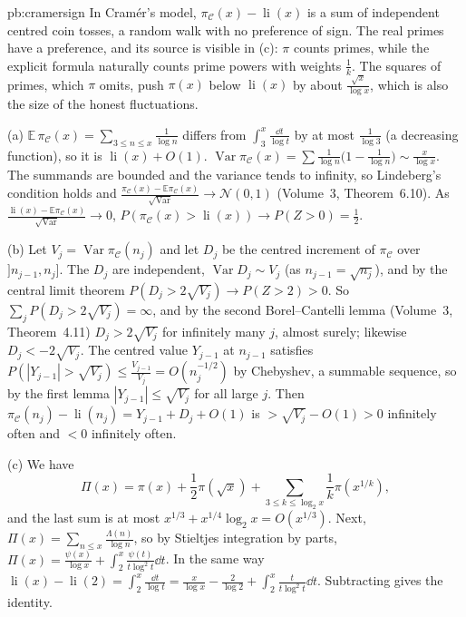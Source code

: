 \begin{solution}{pb:cramersign}
\idea In Cramér's model, $\pi_{\mathcal C}(x)-\operatorname{li}(x)$ is a sum of independent centred coin tosses, a random walk with no preference of sign. The real primes have a preference,
and its source is visible in (c): $\pi$ counts primes, while the explicit formula naturally counts prime powers with weights $\frac1k$. The squares of primes, which $\pi$ omits,
push $\pi(x)$ below $\operatorname{li}(x)$ by about $\frac{\sqrt x}{\log x}$, which is also the size of the honest fluctuations.

\writeup (a) $\mathbb E\,\pi_{\mathcal C}(x)=\sum_{3\le n\le x}\frac1{\log n}$ differs from $\int_3^x\frac{\dd t}{\log t}$ by at most $\frac1{\log3}$ (a decreasing function), so it is
$\operatorname{li}(x)+O(1)$. $\operatorname{Var}\pi_{\mathcal C}(x)=\sum\frac1{\log n}\bigl(1-\frac1{\log n}\bigr)\sim\frac x{\log x}$. The summands are bounded and the variance tends to infinity, so
Lindeberg's condition holds and $\frac{\pi_{\mathcal C}(x)-\mathbb E\pi_{\mathcal C}(x)}{\sqrt{\operatorname{Var}}}\to\mathcal N(0,1)$ (Volume~3, Theorem~6.10). As
$\frac{\operatorname{li}(x)-\mathbb E\pi_{\mathcal C}(x)}{\sqrt{\operatorname{Var}}}\to0$, $P(\pi_{\mathcal C}(x)>\operatorname{li}(x))\to P(Z>0)=\frac12$.

(b) Let $V_j=\operatorname{Var}\pi_{\mathcal C}(n_j)$ and let $D_j$ be the centred increment of $\pi_{\mathcal C}$ over $]n_{j-1},n_j]$. The $D_j$ are independent, $\operatorname{Var}D_j\sim V_j$ (as
$n_{j-1}=\sqrt{n_j}$), and by the central limit theorem $P(D_j>2\sqrt{V_j})\to P(Z>2)>0$. So $\sum_jP(D_j>2\sqrt{V_j})=\infty$, and by the second Borel--Cantelli lemma (Volume~3,
Theorem~4.11) $D_j>2\sqrt{V_j}$ for infinitely many $j$, almost surely; likewise $D_j<-2\sqrt{V_j}$. The centred value $Y_{j-1}$ at $n_{j-1}$ satisfies
$P(|Y_{j-1}|>\sqrt{V_j})\le\frac{V_{j-1}}{V_j}=O(n_j^{-1/2})$ by Chebyshev, a summable sequence, so by the first lemma $|Y_{j-1}|\le\sqrt{V_j}$ for all large $j$. Then
$\pi_{\mathcal C}(n_j)-\operatorname{li}(n_j)=Y_{j-1}+D_j+O(1)$ is $>\sqrt{V_j}-O(1)>0$ infinitely often and $<0$ infinitely often.

(c) We have
\[
\Pi(x)=\pi(x)+\frac12\pi(\sqrt x)+\sum_{3\le k\le\log_2x}\frac1k\pi(x^{1/k}),
\]
and the last sum is at most $x^{1/3}+x^{1/4}\log_2x=O(x^{1/3})$. Next, $\Pi(x)=\sum_{n\le x}\frac{\Lambda(n)}{\log n}$,
so by Stieltjes integration by parts, $\Pi(x)=\frac{\psi(x)}{\log x}+\int_2^x\frac{\psi(t)}{t\log^2t}\dd t$. In the same way
$\operatorname{li}(x)-\operatorname{li}(2)=\int_2^x\frac{\dd t}{\log t}=\frac x{\log x}-\frac2{\log2}+\int_2^x\frac{t}{t\log^2t}\dd t$. Subtracting gives the identity.


\end{solution}
